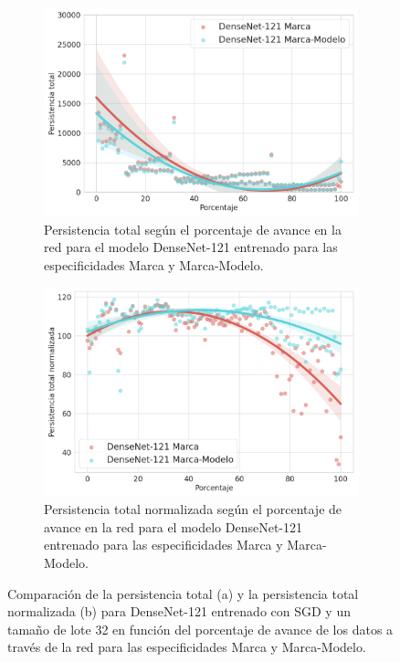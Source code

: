 \begin{figure}[H]
	\centering
	\begin{subfigure}{.5\textwidth}
		\centering
		\includegraphics[width=\linewidth]{img/general_densenet.png}
		\caption{Persistencia total según el porcentaje de avance en la red para el modelo DenseNet-121  entrenado para las especificidades Marca y Marca-Modelo.}
		\label{fig:densenet-1}
	\end{subfigure}%
	\begin{subfigure}{.5\textwidth}
		\centering
		\includegraphics[width=\linewidth]{img/general_densenet_norm.png}
		\caption{Persistencia total normalizada según el porcentaje de avance en la red para el modelo DenseNet-121  entrenado para las especificidades Marca y Marca-Modelo.}
		\label{fig:densenet-2}
	\end{subfigure}
	\caption{Comparación de la persistencia total (a) y la persistencia total normalizada (b) para DenseNet-121 entrenado con SGD y un tamaño de lote 32 en función del porcentaje de avance de los datos a través de la red para las especificidades Marca y Marca-Modelo.}
	\label{fig:densenet}
\end{figure}

